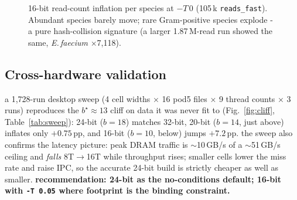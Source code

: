 \documentclass[10.5pt]{article}
\newcommand{\code}[1]{\texttt{\footnotesize #1}}
\begin{document}
\begin{figure}[h!]
\centering
{}
\caption{16-bit read-count inflation per species at $-T\,0$ (105\,k \code{reads\_fast}). Abundant species barely move; rare Gram-positive species explode - a pure hash-collision signature (a larger 1.87\,M-read run showed the same, \textit{E.\,faecium} $\times$7{,}118).}
\label{fig:inflation}
\end{figure}

\subsection{Cross-hardware validation}
a 1{,}728-run desktop sweep (4 cell widths $\times$ 16 pod5 files $\times$ 9 thread counts $\times$ 3 runs) reproduces the $b^\star\!\approx\!13$ cliff on data it was never fit to (Fig.~\ref{fig:cliff}, Table~\ref{tab:sweep}): 24-bit ($b{=}18$) matches 32-bit, 20-bit ($b{=}14$, just above) inflates only $+0.75$\,pp, and 16-bit ($b{=}10$, below) jumps $+7.2$\,pp. the sweep also confirms the latency picture: peak DRAM traffic is $\sim$10\,GB/s of a $\sim$51\,GB/s ceiling and \emph{falls} 8T$\to$16T while throughput rises; smaller cells lower the miss rate and raise IPC, so the accurate 24-bit build is strictly cheaper as well as smaller. \textbf{recommendation: 24-bit as the no-conditions default; 16-bit with \code{-T 0.05} where footprint is the binding constraint.}
\end{document}
